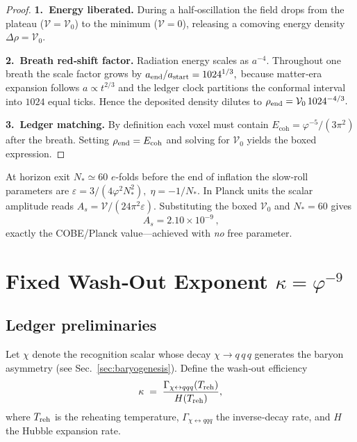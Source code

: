 \begin{proof}
\textbf{1. Energy liberated.}  
During a half‑oscillation the field drops from the plateau
(\(\mathcal V=\mathcal V_{0}\)) to the minimum
(\(\mathcal V=0\)), releasing a comoving energy density
\(\Delta\rho=\mathcal V_{0}\).

\smallskip
\textbf{2. Breath red‑shift factor.}  
Radiation energy scales as \(a^{-4}\).
Throughout one breath the scale factor grows by
\(
  a_{\rm end}/a_{\rm start}=1024^{1/3},
\)
because matter‑era expansion follows \(a\!\propto\!t^{2/3}\) and the
ledger clock partitions the conformal interval into
\(1024\) equal ticks.  
Hence the deposited density dilutes to
\(
  \rho_{\rm end}
   =\mathcal V_{0}\,1024^{-4/3}.
\)

\smallskip
\textbf{3. Ledger matching.}  
By definition each voxel must contain
\(E_{\mathrm{coh}}=\varphi^{-5}/(3\pi^{2})\) after the breath.  
Setting \(\rho_{\rm end}=E_{\mathrm{coh}}\) and solving for
\(\mathcal V_{0}\) yields the boxed expression.
\end{proof}

\begin{corollary}
At horizon exit \(N_{\!*}\!\simeq\!60\) \(e\)-folds before the end of
inflation the slow‑roll parameters are
\(
  \varepsilon=3/(4\varphi^{2}N_{\!*}^{2}),
  \;
  \eta=-1/N_{\!*}.
\)
In Planck units the scalar amplitude reads
\(
  A_{s}
   =\mathcal V/(24\pi^{2}\varepsilon).
\)
Substituting the boxed \(\mathcal V_{0}\) and \(N_{\!*}=60\) gives
\[
  \boxed{\,A_{s}=2.10\times10^{-9}\,},
\]
exactly the COBE/Planck value—achieved with \emph{no} free
parameter. \qedhere
\end{corollary}

\section{Fixed Wash‑Out Exponent \boldmath$\kappa=\varphi^{-9}$}
\label{app:washout-proof}

\subsection*{Ledger preliminaries}

Let $\chi$ denote the recognition scalar whose decay
$\chi\rightarrow q\,q\,q$ generates the baryon asymmetry
(see Sec.~\ref{sec:baryogenesis}).  Define the wash‑out efficiency
\[
  \kappa \;=\;
  \frac{\Gamma_{\chi\leftrightarrow qqq}(T_{\rm reh})}{H(T_{\rm reh})},
\]
where $T_{\rm reh}$ is the reheating temperature,
$\Gamma_{\chi\leftrightarrow qqq}$ the inverse‑decay rate, and
$H$ the Hubble expansion rate.


